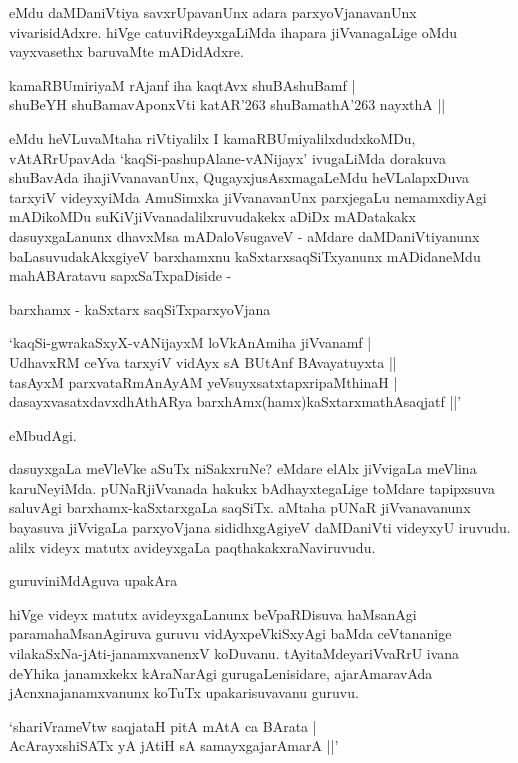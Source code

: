 eMdu daMDaniVtiya savxrUpavanUnx adara parxyoVjanavanUnx vivarisidAdxre. hiVge catuviRdeyxgaLiMda ihapara jiVvanagaLige oMdu vayxvasethx baruvaMte mADidAdxre.

\begin{shloka}
kamaRBUmiriyaM rAjanf iha kaqtAvx shuBAshuBamf |\\
shuBeYH shuBamavAponxVti katAR\char'263 shuBamathA\char'263 nayxthA ||
\end{shloka}

eMdu heVLuvaMtaha riVtiyalilx I kamaRBUmiyalilxdudxkoMDu, vAtARrUpavAda `kaqSi-pashupAlane-vANijayx' ivugaLiMda dorakuva shuBavAda ihajiVvanavanUnx, QugayxjusAsxmagaLeMdu heVLalapxDuva tarxyiV videyxyiMda AmuSimxka jiVvanavanUnx parxjegaLu nemamxdiyAgi mADikoMDu suKiVjiVvanadalilxruvudakekx aDiDx mADatakakx dasuyxgaLanunx dhavxMsa mADaloVsugaveV - aMdare daMDaniVtiyanunx baLasuvudakAkxgiyeV barxhamxnu kaSxtarxsaqSiTxyanunx mADidaneMdu mahABAratavu sapxSaTxpaDiside - 

barxhamx - kaSxtarx saqSiTxparxyoVjana

\begin{shloka}
`kaqSi-gwrakaSxyX-vANijayxM loVkAnAmiha jiVvanamf |\\
UdhavxRM ceYva tarxyiV vidAyx sA BUtAnf BAvayatuyxta ||\\
tasAyxM parxvataRmAnAyAM yeVsuyxsatxtapxripaMthinaH |\\
dasayxvasatxdavxdhAthARya barxhAmx(hamx)kaSxtarxmathAsaqjatf ||'
\end{shloka}

eMbudAgi.

dasuyxgaLa meVleVke aSuTx niSakxruNe? eMdare elAlx jiVvigaLa meVlina karuNeyiMda. pUNaRjiVvanada hakukx bAdhayxtegaLige toMdare tapipxsuva saluvAgi barxhamx-kaSxtarxgaLa saqSiTx. aMtaha pUNaR jiVvanavanunx bayasuva jiVvigaLa parxyoVjana sididhxgAgiyeV daMDaniVti videyxyU iruvudu. alilx videyx matutx avideyxgaLa paqthakakxraNaviruvudu.

guruviniMdAguva upakAra

hiVge videyx matutx avideyxgaLanunx beVpaRDisuva haMsanAgi paramahaMsanAgiruva guruvu vidAyxpeVkiSxyAgi baMda ceVtananige vilakaSxNa-jAti-janamxvanenxV koDuvanu. tAyitaMdeyariVvaRrU ivana deYhika janamxkekx kAraNarAgi gurugaLenisidare, ajarAmaravAda jAcnxnajanamxvanunx koTuTx upakarisuvavanu guruvu.

\begin{shloka}
`shariVrameVtw saqjataH pitA mAtA ca BArata |\\
AcArayxshiSATx yA jAtiH sA samayxgajarAmarA ||'
\end{shloka}

